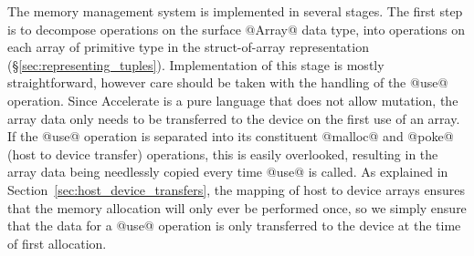 The memory management system is implemented in several stages. The first step is
to decompose operations on the surface @Array@ data type, into operations on
each array of primitive type in the struct-of-array representation
(\S\ref{sec:representing_tuples}).
%
Implementation of this stage is mostly straightforward, however care should be
taken with the handling of the @use@ operation. Since Accelerate is a pure
language that does not allow mutation, the array data only needs to be
transferred to the device on the first use of an array. If the @use@ operation
is separated into its constituent @malloc@ and @poke@ (host to device transfer)
operations, this is easily overlooked, resulting in the array data being
needlessly copied every time @use@ is called. As explained in
Section~\ref{sec:host_device_transfers}, the mapping of host to device arrays
ensures that the memory allocation will only ever be performed once, so we
simply ensure that the data for a @use@ operation is only transferred to the
device at the time of first allocation.

